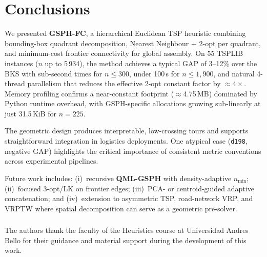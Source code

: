 \documentclass[runningheads]{llncs}
\begin{document}
\section{Conclusions}
\label{sec:conclusions}

We presented \textbf{GSPH-FC}, a hierarchical Euclidean TSP
heuristic combining bounding-box quadrant decomposition, Nearest
Neighbour + 2-opt per quadrant, and minimum-cost frontier
connectivity for global assembly. On 55 TSPLIB instances
($n$ up to 5\,934), the method achieves a typical GAP of 3--12\%
over the BKS with sub-second times for $n\!\le\!300$, under 100\,s
for $n\!\le\!1{,}900$, and natural 4-thread parallelism that
reduces the effective 2-opt constant factor by $\approx\!4\times$.
Memory profiling confirms a near-constant footprint ($\approx$4.75\,MB)
dominated by Python runtime overhead, with GSPH-specific allocations
growing sub-linearly at just 31.5\,KiB for $n=225$.

The geometric design produces interpretable, low-crossing tours and
supports straightforward integration in logistics deployments.
One atypical case (\texttt{d198}, negative GAP) highlights the
critical importance of consistent metric conventions across
experimental pipelines.

Future work includes: (i)~recursive \textbf{QML-GSPH} with
density-adaptive $n_{\min}$; (ii)~focused 3-opt/LK on frontier
edges; (iii)~PCA- or centroid-guided adaptive concatenation;
and (iv)~extension to asymmetric TSP, road-network VRP, and
VRPTW where spatial decomposition can serve as a geometric
pre-solver.

\begin{credits}
\subsubsection{\ackname}
The authors thank the faculty of the Heuristics course at
Universidad Andres Bello for their guidance and material support
during the development of this work.
\end{credits}



\end{document}
